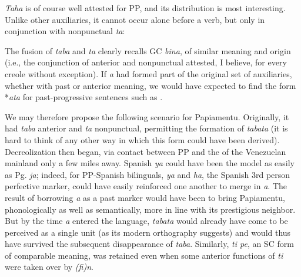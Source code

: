 \textit{Taha} is of course well attested for PP, and its distribution is most interesting. Unlike other auxiliaries, it cannot occur alone before a verb, but only in conjunction with nonpunctual \textit{ta}:

\label{ex:2:95}\z

\label{ex:2:96}\z



\label{ex:2:97}\z


\label{ex:2:98}\z

The fusion of \textit{taba} and \textit{ta} clearly recalls GC \textit{bina}, of similar meaning and origin (i.e., the conjunction of anterior and nonpunctual attested, I believe, for every creole without exception). If \textit{a} had formed part of the original set of auxiliaries, whether with past or anterior meaning, we would have expected to find the form *\textit{ata} for past-progressive sentences such as .

We may therefore propose the following scenario for Papiamentu. Originally, it had \textit{taba} anterior and \textit{ta} nonpunctual, permitting the formation of \textit{tabata} (it is hard to think of any other way in which this form could have been derived). Decreolization then began, via contact between PP and the  of the Venezuelan mainland only a few miles away. Spanish \textit{ya} could have been the model as easily as Pg. \textit{ja}; indeed, for PP-Spanish bilinguals, \textit{ya} and \textit{ha}, the Spanish 3rd person perfective marker, could have easily reinforced one another to merge in \textit{a}. The result of borrowing \textit{a} as a past marker would have been to bring Papiamentu, phonologically as well as semantically, more in line with its prestigious neighbor. But by the time \textit{a} entered the language, \textit{tabata} would already have come to be perceived as a single unit (as its modern orthography suggests) and would thus have survived the subsequent disappearance of \textit{taba}. Similarly, \textit{ti pe}, an SC form of comparable meaning, was retained even when some anterior functions of \textit{ti} were taken over by \textit{(fi)n}.

